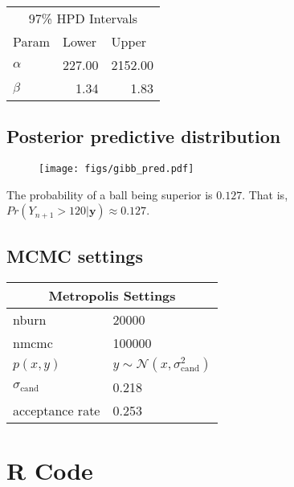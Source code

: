 \documentclass[12pt]{article}
\newcommand{\m}[1]{\mathbf{\bm{#1}}}
\begin{document}
\begin{center}
\begin{tabular}{l|rr}
\multicolumn{3}{c}{97\% HPD Intervals} \\
Param & \multicolumn{1}{l}{Lower} & \multicolumn{1}{l}{Upper} \\ \hline
$\alpha$  & 227.00 & 2152.00 \\
$\beta$   & 1.34 & 1.83 \\
\end{tabular}
\end{center}

\subsection{Posterior predictive distribution}

\begin{figure}[H]
    \centering
    \texttt{[image: figs/gibb\_pred.pdf]}
\end{figure}

\noindent The probability of a ball being superior is $0.127$. That is, $Pr(Y_{n+1} > 120|\m{y}) \approx 0.127$.

\subsection{MCMC settings}

\begin{center}
\begin{tabular}{ll}
\multicolumn{2}{c}{Metropolis Settings} \\ \hline \smallskip
nburn            & 20000 \\ \smallskip
nmcmc            & 100000 \\ \smallskip
$p(x, y)$ & $y\sim\mathcal{N}(x, \sigma_\mathrm{cand}^2)$ \\ \smallskip
$\sigma_{\mathrm{cand}} $ & 0.218 \\ \smallskip
acceptance rate  & 0.253 \\
\end{tabular}
\end{center}

\newpage
\section{R Code}
\begin{tiny}
\lstset{stepnumber=1, numbers=left}

\end{tiny}
\end{document}
